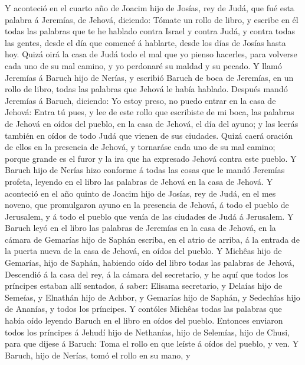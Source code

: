  Y aconteció en el cuarto año de Joacim hijo de Josías,
rey de Judá, que fué esta palabra á Jeremías, de Jehová, diciendo:
 Tómate un rollo de libro, y escribe en él todas las
palabras que te he hablado contra Israel y contra Judá, y contra todas
las gentes, desde el día que comencé á hablarte, desde los días de
Josías hasta hoy.  Quizá oirá la casa de Judá todo el mal
que yo pienso hacerles, para volverse cada uno de su mal camino, y yo
perdonaré su maldad y su pecado.  Y llamó Jeremías á
Baruch hijo de Nerías, y escribió Baruch de boca de Jeremías, en un
rollo de libro, todas las palabras que Jehová le había hablado.
 Después mandó Jeremías á Baruch, diciendo: Yo estoy
preso, no puedo entrar en la casa de Jehová:  Entra tú
pues, y lee de este rollo que escribiste de mi boca, las palabras de
Jehová en oídos del pueblo, en la casa de Jehová, el día del ayuno; y
las leerás también en oídos de todo Judá que vienen de sus ciudades.
 Quizá caerá oración de ellos en la presencia de Jehová, y
tornaráse cada uno de su mal camino; porque grande es el furor y la ira
que ha expresado Jehová contra este pueblo.  Y Baruch hijo
de Nerías hizo conforme á todas las cosas que le mandó Jeremías profeta,
leyendo en el libro las palabras de Jehová en la casa de Jehová.
 Y aconteció en el año quinto de Joacim hijo de Josías,
rey de Judá, en el mes noveno, que promulgaron ayuno en la presencia de
Jehová, á todo el pueblo de Jerusalem, y á todo el pueblo que venía de
las ciudades de Judá á Jerusalem.  Y Baruch leyó en el
libro las palabras de Jeremías en la casa de Jehová, en la cámara de
Gemarías hijo de Saphán escriba, en el atrio de arriba, á la entrada de
la puerta nueva de la casa de Jehová, en oídos del pueblo.
 Y Michêas hijo de Gemarías, hijo de Saphán, habiendo
oído del libro todas las palabras de Jehová,  Descendió á
la casa del rey, á la cámara del secretario, y he aquí que todos los
príncipes estaban allí sentados, á saber: Elisama secretario, y Delaías
hijo de Semeías, y Elnathán hijo de Achbor, y Gemarías hijo de Saphán, y
Sedechîas hijo de Ananías, y todos los príncipes.  Y
contóles Michêas todas las palabras que había oído leyendo Baruch en el
libro en oídos del pueblo.  Entonces enviaron todos los
príncipes á Jehudí hijo de Nethanías, hijo de Selemías, hijo de Chusi,
para que dijese á Baruch: Toma el rollo en que leíste á oídos del
pueblo, y ven. Y Baruch, hijo de Nerías, tomó el rollo en su mano, y
